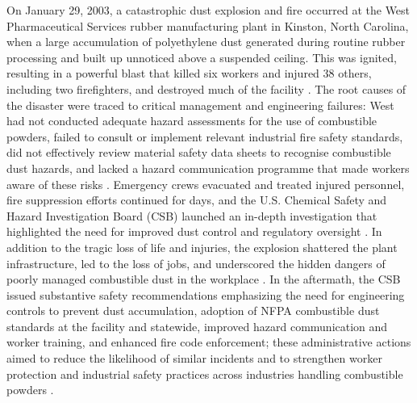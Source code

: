 On January 29, 2003, a catastrophic dust explosion and fire occurred at the West Pharmaceutical Services rubber manufacturing plant in Kinston, North Carolina, when a large accumulation of polyethylene dust generated during routine rubber processing and built up unnoticed above a suspended ceiling. This was ignited, resulting in a powerful blast that killed six workers and injured 38 others, including two firefighters, and destroyed much of the facility \cite{Blair_2007, CSB_West}. The root causes of the disaster were traced to critical management and engineering failures: West had not conducted adequate hazard assessments for the use of combustible powders, failed to consult or implement relevant industrial fire safety standards, did not effectively review material safety data sheets to recognise combustible dust hazards, and lacked a hazard communication programme that made workers aware of these risks \cite{Blair_2007}. Emergency crews evacuated and treated injured personnel, fire suppression efforts continued for days, and the U.S. Chemical Safety and Hazard Investigation Board (CSB) launched an in-depth investigation that highlighted the need for improved dust control and regulatory oversight \cite{Blair_2007, CSB_West}. In addition to the tragic loss of life and injuries, the explosion shattered the plant infrastructure, led to the loss of jobs, and underscored the hidden dangers of poorly managed combustible dust in the workplace \cite{Blair_2007}. In the aftermath, the CSB issued substantive safety recommendations emphasizing the need for engineering controls to prevent dust accumulation, adoption of NFPA combustible dust standards at the facility and statewide, improved hazard communication and worker training, and enhanced fire code enforcement; these administrative actions aimed to reduce the likelihood of similar incidents and to strengthen worker protection and industrial safety practices across industries handling combustible powders \cite{Blair_2007, CSB_West}.

